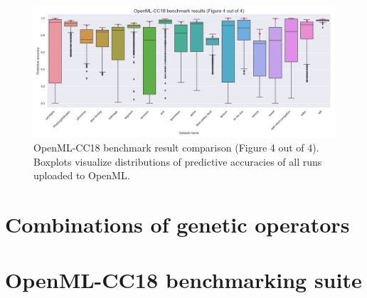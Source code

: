 \begin{figure}
    \includegraphics[width=\textwidth]{../img/openml-boxplot3.png}
    \caption{OpenML-CC18 benchmark result comparison (Figure 4 out of 4).
    Boxplots visualize distributions of predictive accuracies of all
    runs uploaded to OpenML.}
    \label{fig:OpenML:boxplot:3}
\end{figure}







\section{Combinations of genetic operators} \label{sec:exp:genop}


\section{OpenML-CC18 benchmarking suite}

